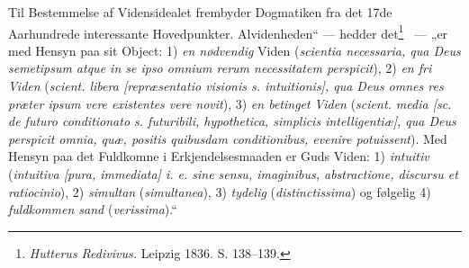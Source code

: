 \documentclass[11pt]{book}
\newcommand{\opage}[1]{\marginnote{\footnotesize\textit{[#1]}}}
\begin{document}
Til Bestemmelse af Vidensidealet frembyder Dogmatiken fra det 17de
Aarhundrede interessante Hovedpunkter. Alvidenheden“ --- hedder
det\footnote{\textit{Hutterus Redivivus.} Leipzig 1836. S.
138--139.}%
\ --- „er med Hensyn paa sit Object: 1) \emph{en nødvendig} Viden
(\textit{scientia necessaria, qua Deus semetipsum atque in se ipso
omnium rerum necessitatem perspicit}), 2) \emph{en fri Viden}
(\textit{scient. libera [repræsentatio visionis s. intuitionis], qua
Deus omnes res præter ipsum vere existentes vere novit}), 3) \emph{en
betinget}
\opage{235} \setcounter{footnote}{0}%
\emph{Viden} (\textit{scient. media [sc. de futuro conditionato s.
futuribili, hypothetica, simplicis intelligentiæ], qua Deus perspicit
omnia, quæ, positis quibusdam conditionibus, evenire potuissent}). Med
Hensyn paa det Fuldkomne i Erkjendelsesmaaden er Guds Viden: 1)
\emph{intuitiv} (\textit{intuitiva [pura, immediata] i. e. sine sensu,
imaginibus, abstractione, discursu et ratiocinio}), 2) \emph{simultan}
(\textit{simultanea}), 3) \emph{tydelig} (\textit{distinctissima}) og
følgelig 4) \emph{fuldkommen sand} (\textit{verissima}).“
\end{document}
